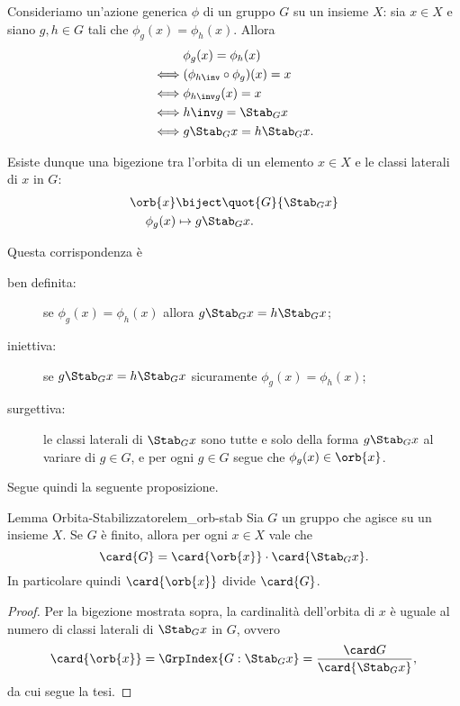 Consideriamo un'azione generica $\phi$ di un gruppo $G$ su un insieme $X$: sia $x \in X$ e siano $g, h \in G$ tali che $\phi_g(x) = \phi_h(x)$. Allora 
\begin{align*}
    &\phi_g(x) = \phi_h(x)\\
    \iff &(\phi_{h\inv} \circ \phi_g)(x) = x\\
    \iff &\phi_{h\inv g}(x) = x\\
    \iff &h\inv g = \Stab_{G}{x}\\
    \iff &g\Stab_{G}{x} = h\Stab_{G}{x}.
\end{align*}

Esiste dunque una bigezione tra l'orbita di un elemento $x \in X$ e le classi laterali di $x$ in $G$:
\begin{align*}
    \orb{x} &\biject \quot{G}{\Stab_{G}{x}}\\
    \phi_g(x) &\mapsto g\Stab_{G}{x}.
\end{align*}

Questa corrispondenza è \begin{description}
    \item[ben definita:] se $\phi_g(x) = \phi_h(x)$ allora $g\Stab_{G}{x} = h\Stab_{G}{x}$;
    \item[iniettiva:] se $g\Stab_{G}{x} = h\Stab_{G}{x}$ sicuramente $\phi_g(x) = \phi_h(x)$;
    \item[surgettiva:] le classi laterali di $\Stab_{G}{x}$ sono tutte e solo della forma $g\Stab_{G}{x}$ al variare di $g \in G$, e per ogni $g \in G$ segue che $\phi_g(x) \in \orb{x}$.
\end{description}


Segue quindi la seguente proposizione.
\begin{proposition}{Lemma Orbita-Stabilizzatore}{lem_orb-stab}
    Sia $G$ un gruppo che agisce su un insieme $X$. Se $G$ è finito, allora per ogni $x \in X$ vale che \begin{equation}
        \card{G} = \card{\orb{x}} \cdot \card{\Stab_{G}{x}}.
    \end{equation}
    In particolare quindi $\card{\orb{x}}$ divide $\card{G}$.
\end{proposition}
\begin{proof}
    Per la bigezione mostrata sopra, la cardinalità dell'orbita di $x$ è uguale al numero di classi laterali di $\Stab_{G}{x}$ in $G$, ovvero \[
        \card{\orb{x}} = \GrpIndex{G : \Stab_{G}{x}} = \frac{\card G}{\card{\Stab_{G}{x}}},    
    \] da cui segue la tesi.
\end{proof}

